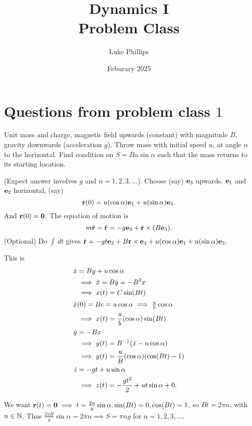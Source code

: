 \documentclass[10pt, a4paper]{article}
\title{Dynamics I \\
    \large Problem Class}
\author{Luke Phillips}
\date{Feburary 2025}
\begin{document}
\maketitle

\newpage

\tableofcontents

\newpage

\section{Questions from problem class \texorpdfstring{$1$}{}}

\begin{problem}[$2020$ exam]
    Unit mass and charge,
    magnetic field upwards
    (constant)
    with magnitude $B$,
    gravity downwards
    (acceleration $g$).
    Throw mass with initial speed $u$,
    at angle $\alpha$ to the horizontal.
    Find condition on $S = Bu\sin{\alpha}$ such that the mass returns to its starting location.

    \begin{solution}
        (Expect answer involves $g$ and $n = 1, 2, 3, \dotsc$).
        Choose
        (say)
        $\mathbf{e}_3$ upwards,
        $\mathbf{e}_1$ and $\mathbf{e}_2$ horizontal,
        (say)
        \[
        \dot{\mathbf{r}}(0) = u(\cos{\alpha})\mathbf{e}_1 + u(\sin{\alpha})\mathbf{e}_3.
        \]
        And $\mathbf{r}(0) = \mathbf{0}$.
        The equation of motion is
        \[
        m\ddot{\mathbf{r}} = \ddot{\mathbf{r}} = -g\mathbf{e}_3 + \dot{\mathbf{r}} \times (B\mathbf{e}_3).
        \]
        (Optional)
        Do $\int\,dt$ gives $\dot{\mathbf{r}} = -gt\mathbf{e}_3 + B\mathbf{r} \times \mathbf{e}_3 + u(\cos{\alpha})\mathbf{e}_1 + u(\sin{\alpha})\mathbf{e}_3$.

        This is
        \begin{align*}
            \dot{x} &= By + u\cos{\alpha} \\
            &\implies \ddot{x} = B\dot{y} = -B ^ 2x \\
            &\implies x(t) = C\sin(Bt) \\
            \intertext{$\dot{x}(0) = Bc = u\cos{\alpha} \implies \frac{u}{b}\cos{\alpha}$}
            &\implies x(t) = \frac{u}{b}(\cos{\alpha})\sin(Bt) \\
            \dot{y} &= -Bx \\
            &\implies y(t) = B ^ {-1}(\dot{x} - u\cos{\alpha}) \\
            &\implies y(t) = \frac{u}{B}(\cos{\alpha})(\cos(Bt) - 1) \\
            \dot{z} &= -gt + u\sin{\alpha} \\
            &\implies z(t) = -\frac{gt ^ 2}{2} + ut\sin{\alpha} + 0.
        \end{align*}

        We want $\mathbf{r}(t) = \mathbf{0} \implies t = \frac{2u}{g}\sin{\alpha}, \sin(Bt) = 0, \cos(Bt) = 1$,
        so $Bt = 2\pi n$,
        with $n \in \mathbb{N}$.
        Thus $\frac{2uB}{g}\sin{\alpha} = 2\pi n \implies S = \pi n g$ for $n = 1, 2, 3, \dotsc$.
    \end{solution}
\end{problem}
\end{document}
